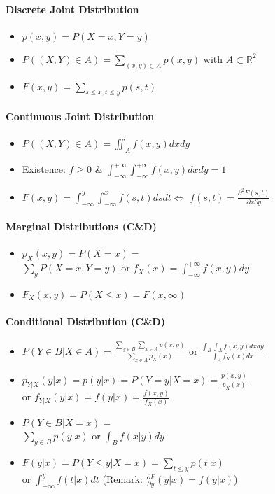 \documentclass[paper=a4,fontsize=8pt,pagesize,DIV=calc]{scrartcl}
\newcounter{row}
\begin{document}
\begin{multicols}{3}
\paragraph{Discrete Joint Distribution}
\begin{itemize}
\item $p(x,y)=P(X=x,Y=y)$
\item $P((X,Y)\in A)=\sum_{(x,y)\in A} p(x,y)$ with $A\subset\mathbb{R}^2$
\item $F(x,y)=\sum_{s\leq x, t\leq y} p(s,t)$
\end{itemize}
\paragraph{Continuous Joint Distribution}
\begin{itemize}
\item $P((X,Y)\in A)=\iint_Af(x,y)dxdy$
\item Existence: $f\geq 0$ \& $\int^{+\infty}_{-\infty}\int^{+\infty}_{-\infty} f(x,y)dxdy=1$
\item $F(x,y)=\int^{y}_{-\infty}\int^{x}_{-\infty} f(s,t)dsdt \Leftrightarrow$ $f(s,t)=\frac{\partial^2F(s,t)}{\partial x\partial y}$
\end{itemize}
\paragraph{Marginal Distributions (C\&D)}
\begin{itemize}
\item $p_X(x,y)=P(X=x)=$\\
$\sum_y P(X=x,Y=y)$ or $f_X(x)=\int^{+\infty}_{-\infty}f(x,y)dy$
\item $F_X(x,y)=P(X\leq x)=F(x,\infty)$
\end{itemize}
\paragraph{Conditional Distribution (C\&D)}
\begin{itemize}
\item $P(Y\in B|X\in A)=\frac{\sum_{y\in B} \sum_{x\in A}p(x,y)}{\sum_{x\in A}p_X(x)}$ or $ \frac{\int_B \int_A f(x,y)dx dy}{\int_A f_X(x)dx}$
\item $p_{Y|X}(y|x)=p(y|x)=P(Y=y|X=x)=\frac{p(x,y)}{p_X(x)}$\\
or $f_{Y|X}(y|x)=f(y|x)=\frac{f(x,y)}{f_X(x)}$
\item $P(Y\in B|X=x)=$\\ 
$ \sum_{y\in B} p(y|x)$ or $\int_B f(x|y)dy$
\item $F(y|x)=P(Y\leq y|X=x)= \sum_{t\leq y} p(t|x)$\\ or $\int_{-\infty}^y f(t|x)dt$ (Remark: $\frac{\partial F}{\partial y}(y|x)=f(y|x)$)
\end{itemize}

\end{multicols}
\end{document}
